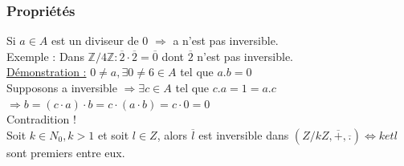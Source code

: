 \documentclass[11pt]{article}
\begin{document}
			\subsubsection{Propriétés}
				Si $a \in A$ est un diviseur de 0 $\Rightarrow$ a n'est pas inversible.\\
				Exemple : Dans $\mathbb Z /4 \mathbb Z : \overline{2} \cdot \overline{2} = \overline{0}$ dont $\overline{2}$ n'est pas inversible. \\ 
				\underline{Démonstration :}
					$0 \neq a, \exists 0 \neq 6 \in A$ tel que $a.b = 0$\\
					Supposons a inversible $\Rightarrow \exists c \in A$ tel que $c.a = 1 = a.c$ \\
					$\Rightarrow b = (c \cdot a) \cdot b = c \cdot (a \cdot b) = c \cdot 0 = 0$\\
					Contradition !\\
	
				Soit $k \in N_0, k > 1$ et soit $l \in Z$, alors $\overline{l}$ est inversible dans $(Z/kZ, \overline{+}, \overline{.}) \Leftrightarrow k et l$ sont premiers entre eux.
			
\end{document}
